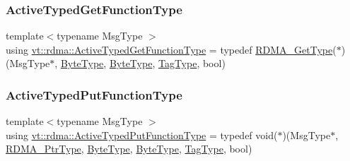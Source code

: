 \mbox{\label{namespacevt_1_1rdma_a903d8f605dadc2456d4a1c6fcb83eda4}} 
\subsubsection{\texorpdfstring{Active\+Typed\+Get\+Function\+Type}{ActiveTypedGetFunctionType}}
{\footnotesize\ttfamily template$<$typename Msg\+Type $>$ \\
using \hyperlink{namespacevt_1_1rdma_a903d8f605dadc2456d4a1c6fcb83eda4}{vt\+::rdma\+::\+Active\+Typed\+Get\+Function\+Type} = typedef \hyperlink{namespacevt_a1cab7f4860f65a49ad2c042d6240f288}{R\+D\+M\+A\+\_\+\+Get\+Type}($\ast$)(Msg\+Type$\ast$, \hyperlink{namespacevt_aab8d55968084610ce3b17057981e9300}{Byte\+Type}, \hyperlink{namespacevt_aab8d55968084610ce3b17057981e9300}{Byte\+Type}, \hyperlink{namespacevt_a84ab281dae04a52a4b243d6bf62d0e52}{Tag\+Type}, bool)}

\mbox{\label{namespacevt_1_1rdma_a56f7eb7ecfa7e6824d3abb4afb634a37}} 
\subsubsection{\texorpdfstring{Active\+Typed\+Put\+Function\+Type}{ActiveTypedPutFunctionType}}
{\footnotesize\ttfamily template$<$typename Msg\+Type $>$ \\
using \hyperlink{namespacevt_1_1rdma_a56f7eb7ecfa7e6824d3abb4afb634a37}{vt\+::rdma\+::\+Active\+Typed\+Put\+Function\+Type} = typedef void($\ast$)(Msg\+Type$\ast$, \hyperlink{namespacevt_a9e2c953286c7616f7c218e9951790776}{R\+D\+M\+A\+\_\+\+Ptr\+Type}, \hyperlink{namespacevt_aab8d55968084610ce3b17057981e9300}{Byte\+Type}, \hyperlink{namespacevt_aab8d55968084610ce3b17057981e9300}{Byte\+Type}, \hyperlink{namespacevt_a84ab281dae04a52a4b243d6bf62d0e52}{Tag\+Type}, bool)}

\mbox{\label{namespacevt_1_1rdma_a1273aeddd73c1ffac0d7383ef7a314d8}} 

